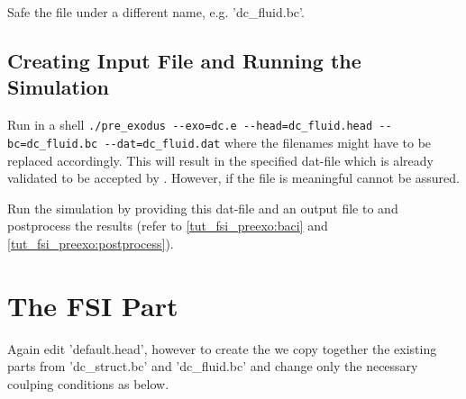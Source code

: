 Safe the file under a different name, e.g. 'dc\_fluid.bc'.

\subsection{Creating \baci{} Input File and Running the Simulation}
Run in a shell \verb|./pre_exodus --exo=dc.e --head=dc_fluid.head --bc=dc_fluid.bc --dat=dc_fluid.dat| where the filenames might have to be replaced accordingly. This will result in the specified dat-file which is already validated to be accepted by \baci{}. However, if the file is meaningful cannot be assured.

Run the simulation by providing this dat-file and an output file to \baci{} and postprocess the results (refer to \ref{tut_fsi_preexo:baci} and \ref{tut_fsi_preexo:postprocess}).

\section{The FSI Part}
Again edit 'default.head', however to create the \bc we copy together the existing parts from 'dc\_struct.bc' and 'dc\_fluid.bc' and change only the necessary coulping conditions as below.

